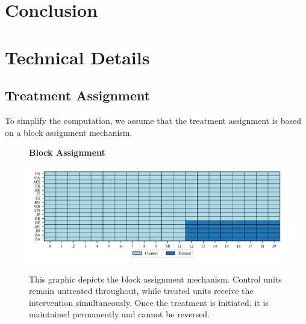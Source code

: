 \documentclass[12pt]{article}
\begin{document}
\section{Conclusion} 
\label{sec: conclusion}


\clearpage
\begingroup
{}


\endgroup

\clearpage
\appendix
{}
\renewcommand{\theequation}{\thesection.\arabic{equation}}
\setcounter{equation}{0}
\renewcommand{\theassumption}{\thesection.\arabic{assumption}}
\setcounter{assumption}{1}
\renewcommand{\thefigure}{\thesection.\arabic{figure}}
\setcounter{figure}{0}
\renewcommand{\thetable}{\thesection.\arabic{table}}
\setcounter{figure}{0}

\section{Technical Details}
\label{sec: appendix}

\subsection{Treatment Assignment}
\label{app: treatment assignment}

To simplify the computation, we assume that the treatment assignment is based on a block assignment mechanism. 

\begin{figure}[!ht]
\centering
\caption{\textbf{Block Assignment}}
\includegraphics{figs/block_assignment.png}
\label{app: block assignment}
\caption*{\footnotesize{This graphic depicts the block assignment mechanism. Control units remain untreated throughout, while treated units receive the intervention simultaneously. Once the treatment is initiated, it is maintained permanently and cannot be reversed.}}
\end{figure}
\end{document}
